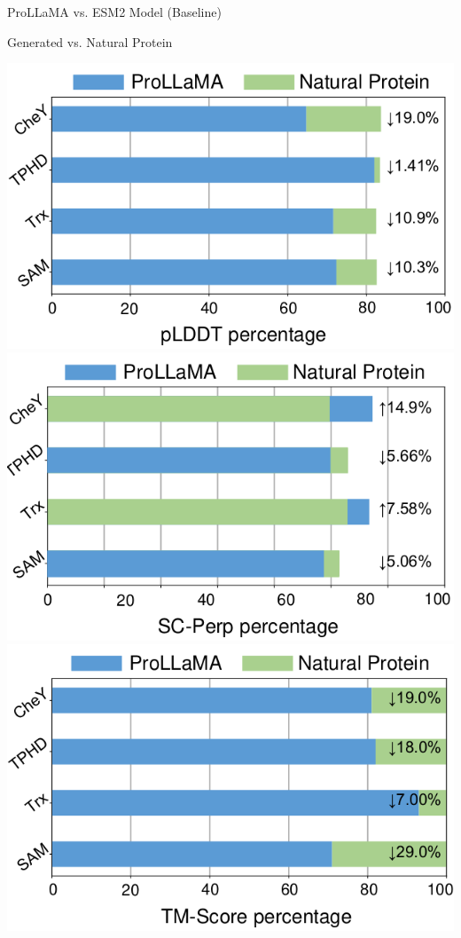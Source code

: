 \documentclass[dvipsnames]{beamer}
\begin{document}
\begin{frame}{ProLLaMA vs. ESM2 Model (Baseline)}
\begin{center}
	\end{center}
\end{frame}

\begin{frame}{Generated vs. Natural Protein}
	\begin{center}
		\includegraphics[scale=0.7]{images/d.png}
		\includegraphics[scale=0.7]{images/e.png}
		\includegraphics[scale=0.7]{images/f.png}
	\end{center}
\end{frame}
\end{document}
